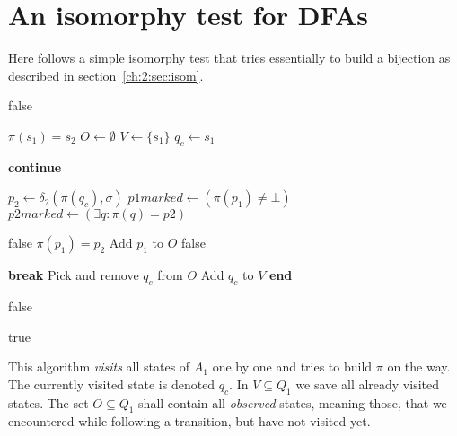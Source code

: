 
\chapter{An isomorphy test for DFAs}\label{ch:app:ism-test}

Here follows a simple isomorphy test that tries essentially to build a bijection as described in section~\ref{ch:2:sec:isom}.
\vspace{0.2cm}
\begin{algorithmic}[1]
			\State \Return false
		\EndIf
		
		\State $\pi(s_1) = s_2$ 
		\State $O \gets \emptyset$ 
		\State $V \gets \{s_1\}$ 
		\State $q_c \gets s_1$ 
		
			 
					\State \textbf{continue}
				\EndIf
				
				\State
				
				\State $p_2 \gets \delta_2(\pi(q_c), \sigma)$ 
				\State $p1marked \gets (\pi(p_1) \neq \bot)$ 
				\State $p2marked \gets (\exists q\colon \pi(q)=p2)$
				
				\State
				
						\State \Return false
					\EndIf
					\State $\pi(p_1) = p_2$
					\State Add $p_1$ to $O$
				\EndIf
				\Else
					\State \Return false
				\EndIf
			\EndFor	
			
				\State \textbf{break}
			\EndIf
			\State Pick and remove $q_c$ from $O$
			\State Add $q_c$ to $V$
		\EndWhile
		\State\textbf{end}
		
				\State \Return false
			\EndIf
		\EndFor	
		
		\State \Return true
	\EndFunction
\end{algorithmic}
\vspace{0.2cm}
\newpage
\noindent This algorithm \emph{visits} all states of $A_1$ one by one and tries to build $\pi$ on the way. The currently visited state is denoted $q_c$. In $V \subseteq Q_1$ we save all already visited states. The set $O \subseteq Q_1$ shall contain all \emph{observed} states, meaning those, that we encountered while following a transition, but have not visited yet.

